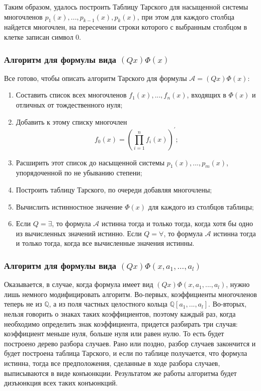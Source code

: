 Таким образом, удалось построить Таблицу Тарского для насыщенной системы многочленов $p_1(x), ... , p_{k-1}(x), p_k(x)$, при этом для каждого столбца найдется многочлен, на пересечении строки которого с выбранным столбцом в клетке записан символ $0$.

\subsubsection{Алгоритм для формулы вида $(Qx)\Phi(x)$}

Все готово, чтобы описать алгоритм Тарского для формулы $\mathcal{A} = (Qx)\Phi(x)$:
\begin{enumerate}
    \item Составить список всех многочленов $f_1(x), ... , f_n(x)$, входящих в $\Phi(x)$ и отличных от тождественного нуля;
    \item Добавить к этому списку многочлен 
    \begin{equation*}
        f_0(x) = \left( \prod\limits_{i = 1}^n f_i(x) \right)^\prime;
    \end{equation*}
    \item Расширить этот список до насыщенной системы $p_1(x), ... , p_m(x)$, упорядоченной по не убыванию степени;
    \item Построить таблицу Тарского, по очереди добавляя многочлены; 
    \item Вычислить истинностное значение $\Phi(x)$ для каждого из столбцов таблицы;
    \item Если $Q = \exists$, то формула $\mathcal{A}$ истинна тогда и только тогда, когда хотя бы одно из вычисленных значений истинно. Если $Q = \forall$, то формула $\mathcal{A}$ истинна тогда и только тогда, когда все вычисленные значения истинны.
\end{enumerate}

\subsubsection{Алгоритм для формулы вида $(Qx)\Phi(x, a_1, ... , a_l)$}

Оказывается, в случае, когда формула имеет вид $(Qx)\Phi(x, a_1, ... , a_l)$, нужно лишь немного модифицировать алгоритм. Во-первых, коэффициенты многочленов теперь не из $\mathbb{Q}$, а из поля частных целостного кольца $\mathbb{Q}\left[a_1, ... , a_l\right]$. Во-вторых, нельзя говорить о знаках таких коэффициентов, поэтому каждый раз, когда необходимо определить знак коэффициента, придется разбирать три случая: коэффициент меньше нуля, больше нуля или равен нулю. То есть будет построено дерево разбора случаев. Рано или поздно, разбор случаев закончится и будет построена таблица Тарского, и если по таблице получается, что формула истинна, тогда все предположения, сделанные в ходе разбора случаев, выписываются в виде конъюнкции. Результатом же работы алгоритма будет дизъюнкция всех таких конъюнкций.

